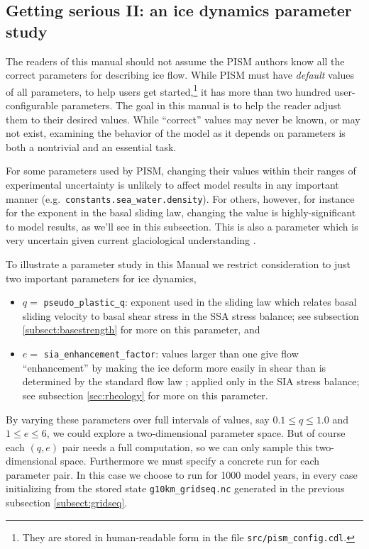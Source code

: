 \subsection{Getting serious II: an ice dynamics parameter study}  \label{subsect:paramstudy}

The readers of this manual should not assume the PISM authors know all the correct parameters for describing ice flow.  While PISM must have \emph{default} values of all parameters, to help users get started,\footnote{They are stored in human-readable form in the file \texttt{src/pism_config.cdl}.} it has more than two hundred user-configurable parameters.  The goal in this manual is to help the reader adjust them to their desired values.  While ``correct'' values may never be known, or may not exist, examining the behavior of the model as it depends on parameters is both a nontrivial and an essential task.

For some parameters used by PISM, changing their values within their ranges of experimental uncertainty is unlikely to affect model results in any important manner (e.g.~\texttt{constants.sea_water.density}).  For others, however, for instance for the exponent in the basal sliding law, changing the value is highly-significant to model results, as we'll see in this subsection.  This is also a parameter which is very uncertain given current glaciological understanding \cite{CuffeyPaterson}.

To illustrate a parameter study in this Manual we restrict consideration to just two important parameters for ice dynamics,\begin{itemize}
\item $q=$ \texttt{pseudo_plastic_q}: exponent used in the sliding law which relates basal sliding velocity to basal shear stress in the SSA stress balance; see subsection \ref{subsect:basestrength} for more on this parameter, and
\item $e=$ \texttt{sia_enhancement_factor}: values larger than one give flow ``enhancement'' by making the ice deform more easily in shear than is determined by the standard flow law \cite{LliboutryDuval1985,PatersonBudd}; applied only in the SIA stress balance; see subsection \ref{sec:rheology} for more on this parameter.
\end{itemize}

By varying these parameters over full intervals of values, say $0.1\le q \le 1.0$ and $1 \le e \le 6$, we could explore a two-dimensional parameter space.  But of course each $(q,e)$ pair needs a full computation, so we can only sample this two-dimensional space.  Furthermore we must specify a concrete run for each parameter pair.  In this case we choose to run for 1000 model years, in every case initializing from the stored state \texttt{g10km_gridseq.nc} generated in the previous subsection \ref{subsect:gridseq}.

